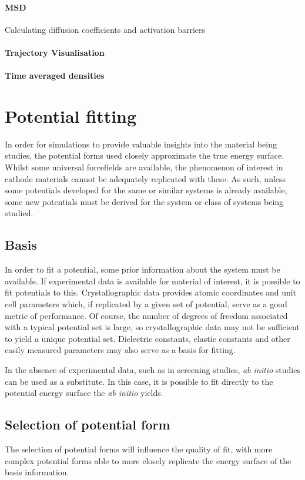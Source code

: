 \paragraph{MSD}
Calculating diffusion coefficients and activation barriers
\paragraph{Trajectory Visualisation}
\paragraph{Time averaged densities}


\newpage
\section{Potential fitting}
In order for simulations to provide valuable insights into the material being studies, the potential forms used closely approximate the true energy surface.
Whilst some universal forcefields are available, the phenomenon of interest in cathode materials cannot be adequately replicated with these.
As such, unless some potentials developed for the same or similar systems is already available, some new potentials must be derived for the system or class of systems being studied.

\subsection{Basis}
In order to fit a potential, some prior information about the system must be available. 
If experimental data is available for material of interest, it is possible to fit potentials to this.
Crystallographic data provides atomic coordinates and unit cell parameters which, if replicated by a given set of potential, serve as a good metric of performance.
Of course, the number of degrees of freedom associated with a typical potential set is large, so crystallographic data may not be sufficient to yield a unique potential set.
Dielectric constants, elastic constants and other easily measured parameters may also serve as a basis for fitting.

In the absence of experimental data, such as in screening studies, \textit{ab initio} studies can be used as a substitute. 
In this case, it is possible to fit directly to the potential energy surface the \textit{ab initio} yields.

\subsection{{\color{red}Selection of potential form}}
The selection of potential forms will influence the quality of fit, with more complex potential forms able to more closely replicate the energy surface of the basis information.


